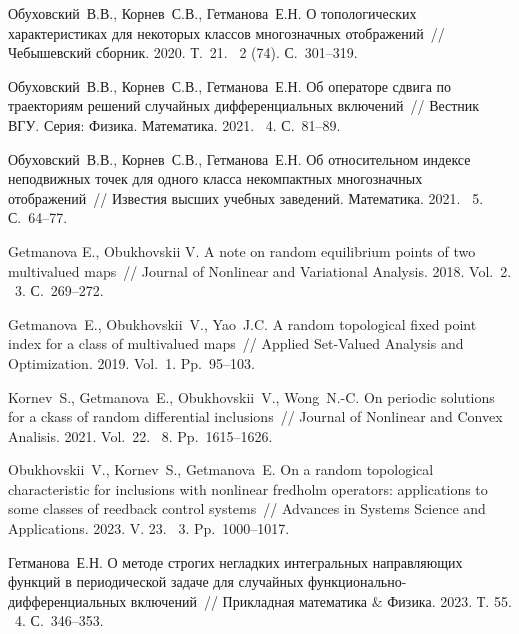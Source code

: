 \begin{thebibliography}{9} %

 Обуховский~В.В., Корнев~С.В., Гетманова~Е.Н. О топологических характеристиках для некоторых классов многозначных отображений~// Чебышевский сборник. 2020. Т.~21. \textnumero~2 (74). С.~301--319.

   Обуховский~В.В., Корнев~С.В., Гетманова~Е.Н. Об операторе сдвига по траекториям решений случайных дифференциальных включений~// Вестник ВГУ. Серия: Физика. Математика. 2021. \textnumero~4. С.~81--89.

  Обуховский~В.В., Корнев~С.В., Гетманова~Е.Н.  Об относительном индексе неподвижных точек для одного класса некомпактных многозначных отображений~// Известия высших учебных заведений. Математика. 2021. \textnumero~5. С.~64--77.

 Getmanova E., Obukhovskii V. A note on random equilibrium points of two multivalued maps~// Journal of Nonlinear and Variational Analysis. 2018. Vol.~2. \textnumero~3. С.~269--272.

  Getmanova~E., Obukhovskii~V., Yao~J.C. A random topological fixed point index for a class of multivalued maps~// Applied Set-Valued Analysis and Optimization. 2019. Vol.~1. Pp.~95--103.

  Kornev~S., Getmanova~E., Obukhovskii~V., Wong~N.-C. On periodic solutions for a ckass of random differential inclusions~// Journal of Nonlinear and Convex Analisis. 2021. Vol.~22. \textnumero~8. Pp.~1615--1626.
	
 Obukhovskii~V., Kornev~S., Getmanova~E. On a random topological characteristic for inclusions with nonlinear fredholm operators: applications to some classes of reedback control systems~// Advances in Systems Science and Applications. 2023. V. 23. \textnumero~3. Pp.~1000--1017.

 Гетманова~Е.Н. О методе строгих негладких интегральных направляющих функций  в периодической задаче для случайных функционально-диф\-фе\-рен\-циаль\-ных включений~// Прикладная математика \& Физика. 2023. Т. 55. \textnumero~4. С.~346--353.

\end{thebibliography}




%

